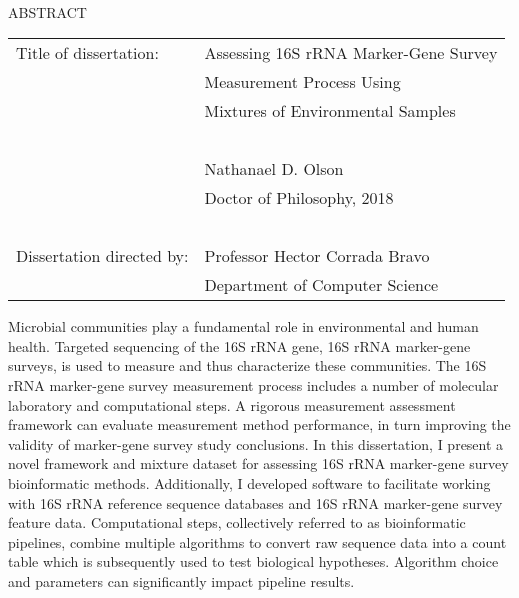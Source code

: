 
\hbox{\ }

\renewcommand{\baselinestretch}{1}
\small \normalsize

\begin{center}
\large{{ABSTRACT}}

\vspace{3em}

\end{center}
\hspace{-.15in}
\begin{tabular}{ll}
Title of dissertation:    & {\large  Assessing 16S rRNA Marker-Gene Survey}\\
&                     {\large  Measurement Process Using} \\
&                     {\large  Mixtures of Environmental Samples} \\
\ \\
&                          {\large  Nathanael D. Olson} \\
&                           {\large Doctor of Philosophy, 2018} \\
\ \\
Dissertation directed by: & {\large  Professor Hector Corrada Bravo} \\
&               {\large  Department of Computer Science } \\
\end{tabular}

\vspace{3em}

\renewcommand{\baselinestretch}{2}
\large \normalsize

Microbial communities play a fundamental role in environmental and human health.
Targeted sequencing of the 16S rRNA gene, 16S rRNA marker-gene surveys, is used to measure and thus characterize these communities.
The 16S rRNA marker-gene survey measurement process includes a number of molecular laboratory and computational steps.
A rigorous measurement assessment framework can evaluate measurement method performance, in turn improving the validity of marker-gene survey study conclusions.
In this dissertation, I present a novel framework and mixture dataset for assessing 16S rRNA marker-gene survey bioinformatic methods.
Additionally, I developed software to facilitate working with 16S rRNA reference sequence databases and 16S rRNA marker-gene survey feature data.
Computational steps, collectively referred to as bioinformatic pipelines, combine multiple algorithms to convert raw sequence data into a count table which is subsequently used to test biological hypotheses.
Algorithm choice and parameters can significantly impact pipeline results.

